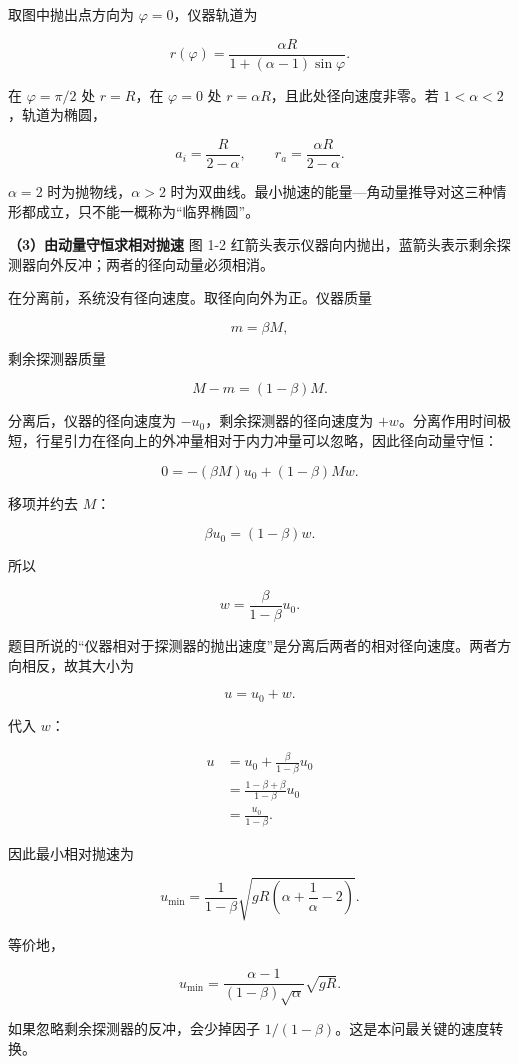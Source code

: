 \documentclass[12pt,a4paper,UTF8]{ctexart}
\begin{document}
取图中抛出点方向为 \(\varphi=0\)，仪器轨道为

\[r(\varphi)=\frac{\alpha R}{1+(\alpha-1)\sin\varphi}.\]

在 \(\varphi=\pi/2\) 处 \(r=R\)，在 \(\varphi=0\) 处
\(r=\alpha R\)，且此处径向速度非零。若 \(1<\alpha<2\)，轨道为椭圆，

\[a_i=\frac{R}{2-\alpha},\qquad
r_a=\frac{\alpha R}{2-\alpha}.\]

\(\alpha=2\) 时为抛物线，\(\alpha>2\)
时为双曲线。最小抛速的能量---角动量推导对这三种情形都成立，只不能一概称为``临界椭圆''。

\textbf{（3）由动量守恒求相对抛速} 图 1-2
红箭头表示仪器向内抛出，蓝箭头表示剩余探测器向外反冲；两者的径向动量必须相消。

在分离前，系统没有径向速度。取径向向外为正。仪器质量

\[m=\beta M,\]

剩余探测器质量

\[M-m=(1-\beta)M.\]

分离后，仪器的径向速度为 \(-u_0\)，剩余探测器的径向速度为
\(+w\)。分离作用时间极短，行星引力在径向上的外冲量相对于内力冲量可以忽略，因此径向动量守恒：

\[0=-(\beta M)u_0+(1-\beta)Mw.\]

移项并约去 \(M\)：

\[\beta u_0=(1-\beta)w.\]

所以

\[w=\frac{\beta}{1-\beta}u_0.\]

题目所说的``仪器相对于探测器的抛出速度''是分离后两者的相对径向速度。两者方向相反，故其大小为

\[u=u_0+w.\]

代入 \(w\)：

\[\begin{aligned}
u
&=u_0+\frac{\beta}{1-\beta}u_0\\
&=\frac{1-\beta+\beta}{1-\beta}u_0\\
&=\frac{u_0}{1-\beta}.
\end{aligned}\]

因此最小相对抛速为

\[\boxed{
u_{\min}=
\frac{1}{1-\beta}
\sqrt{gR\left(\alpha+\frac1\alpha-2\right)}
}.\]

等价地，

\[\boxed{
u_{\min}=
\frac{\alpha-1}{(1-\beta)\sqrt{\alpha}}\sqrt{gR}
}.\]

如果忽略剩余探测器的反冲，会少掉因子
\(1/(1-\beta)\)。这是本问最关键的速度转换。
\end{document}

